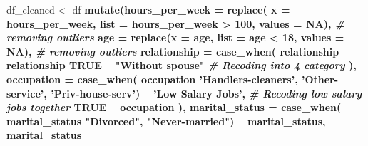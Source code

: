 \documentclass[]{article}
\newenvironment{Shaded}{\begin{snugshade}}{\end{snugshade}}
\newcommand{\CommentTok}[1]{\textcolor[rgb]{0.56,0.35,0.01}{\textit{#1}}}
\newcommand{\DataTypeTok}[1]{\textcolor[rgb]{0.13,0.29,0.53}{#1}}
\newcommand{\DecValTok}[1]{\textcolor[rgb]{0.00,0.00,0.81}{#1}}
\newcommand{\KeywordTok}[1]{\textcolor[rgb]{0.13,0.29,0.53}{\textbf{#1}}}
\newcommand{\NormalTok}[1]{#1}
\newcommand{\OperatorTok}[1]{\textcolor[rgb]{0.81,0.36,0.00}{\textbf{#1}}}
\newcommand{\OtherTok}[1]{\textcolor[rgb]{0.56,0.35,0.01}{#1}}
\newcommand{\StringTok}[1]{\textcolor[rgb]{0.31,0.60,0.02}{#1}}
\begin{document}
\begin{Shaded}
\begin{Highlighting}[]
\NormalTok{df_cleaned <-}\StringTok{ }\NormalTok{df }\OperatorTok{%
\StringTok{  }\KeywordTok{mutate}\NormalTok{(}\DataTypeTok{hours_per_week =} \KeywordTok{replace}\NormalTok{(}
    \DataTypeTok{x =}\NormalTok{ hours_per_week, }
    \DataTypeTok{list =}\NormalTok{ hours_per_week }\OperatorTok{>}\StringTok{ }\DecValTok{100}\NormalTok{,}
    \DataTypeTok{values =} \OtherTok{NA}\NormalTok{), }\CommentTok{# removing outliers}
         \DataTypeTok{age =} \KeywordTok{replace}\NormalTok{(}\DataTypeTok{x =}\NormalTok{ age, }
                       \DataTypeTok{list =}\NormalTok{ age }\OperatorTok{<}\StringTok{ }\DecValTok{18}\NormalTok{, }
                       \DataTypeTok{values =} \OtherTok{NA}\NormalTok{), }\CommentTok{# removing outliers}
         \DataTypeTok{relationship =} \KeywordTok{case_when}\NormalTok{(}
\NormalTok{           relationship }\OperatorTok{%
\NormalTok{           relationship }\OperatorTok{%
           \OtherTok{TRUE} \OperatorTok{~}\StringTok{ "Without spouse"} \CommentTok{# Recoding into 4 category}
\NormalTok{         ),}
         \DataTypeTok{occupation =} \KeywordTok{case_when}\NormalTok{(}
\NormalTok{           occupation }\OperatorTok{%
                             \StringTok{'Handlers-cleaners'}\NormalTok{, }\StringTok{'Other-service'}\NormalTok{, }
                             \StringTok{'Priv-house-serv'}\NormalTok{) }\OperatorTok{~}\StringTok{ 'Low Salary Jobs'}\NormalTok{, }\CommentTok{# Recoding low salary jobs together}
           \OtherTok{TRUE} \OperatorTok{~}\StringTok{ }\NormalTok{occupation}
\NormalTok{         ),}
         \DataTypeTok{marital_status =} \KeywordTok{case_when}\NormalTok{(}
\NormalTok{           marital_status }\OperatorTok{%
                                 \StringTok{"Divorced"}\NormalTok{, }\StringTok{"Never-married"}\NormalTok{) }\OperatorTok{~}\StringTok{ }\NormalTok{marital_status,}
\NormalTok{           marital_status }\OperatorTok{%
}}}}}}
\end{Highlighting}
\end{Shaded}
\end{document}
